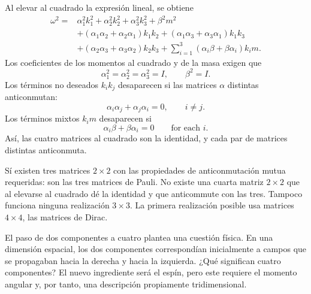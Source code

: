 Al elevar al cuadrado la expresión lineal, se obtiene
\begin{align}
\omega^2
={}&
\alpha_1^2k_1^2+\alpha_2^2k_2^2+\alpha_3^2k_3^2+\beta^2m^2
\nonumber\\
&+(\alpha_1\alpha_2+\alpha_2\alpha_1)k_1k_2
+(\alpha_1\alpha_3+\alpha_3\alpha_1)k_1k_3
\nonumber\\
&+(\alpha_2\alpha_3+\alpha_3\alpha_2)k_2k_3
+\sum_{i=1}^{3}(\alpha_i\beta+\beta\alpha_i)k_i m.
\end{align}
Los coeficientes de los momentos al cuadrado y de la masa exigen que
\begin{equation}
\alpha_1^2=\alpha_2^2=\alpha_3^2=I,
\qquad
\beta^2=I.
\end{equation}
Los términos no deseados \(k_i k_j\) desaparecen si las matrices \(\alpha\) distintas anticonmutan:
\begin{equation}
\alpha_i\alpha_j+\alpha_j\alpha_i=0,
\qquad i\neq j.
\end{equation}
Los términos mixtos \(k_i m\) desaparecen si
\begin{equation}
\alpha_i\beta+\beta\alpha_i=0
\qquad
\text{for each }i.
\end{equation}
Así, las cuatro matrices al cuadrado son la identidad, y cada par de matrices distintas anticonmuta.

Sí existen tres matrices \(2\times2\) con las propiedades de anticonmutación mutua requeridas: son las tres matrices de Pauli. No existe una cuarta matriz \(2\times2\) que al elevarse al cuadrado dé la identidad y que anticommute con las tres. Tampoco funciona ninguna realización \(3\times3\). La primera realización posible usa matrices \(4\times4\), las matrices de Dirac.

El paso de dos componentes a cuatro plantea una cuestión física. En una dimensión espacial, los dos componentes correspondían inicialmente a campos que se propagaban hacia la derecha y hacia la izquierda. ¿Qué significan cuatro componentes? El nuevo ingrediente será el espín, pero este requiere el momento angular y, por tanto, una descripción propiamente tridimensional.

